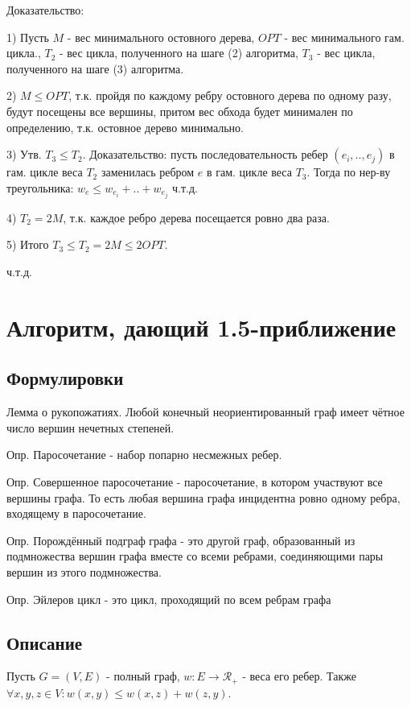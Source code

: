 \documentclass[a4paper,12pt]{article}
\begin{document}
Доказательство:

1) Пусть $M$ - вес минимального остовного дерева, $OPT$ - вес минимального гам. цикла., $T_2$ - вес цикла, полученного на шаге (2) алгоритма, $T_3$ - вес цикла, полученного на шаге (3) алгоритма.

2) $ M \leq OPT$, т.к. пройдя по каждому ребру остовного дерева по одному разу, будут посещены все вершины, притом вес обхода будет минимален по определению, т.к. остовное дерево минимально.

3) Утв. $T_3 \leq T_2$. Доказательство: пусть последовательность ребер $(e_i, .., e_j)$ в гам. цикле веса $T_2$ заменилась ребром $e$ в гам. цикле веса $T_3$. Тогда по нер-ву треугольника: $w_e \leq w_{e_i} + .. + w_{e_j}$ ч.т.д.

4) $T_2 = 2M$, т.к. каждое ребро дерева посещается ровно два раза.

5) Итого $T_3 \leq T_2 = 2M \leq 2OPT$.

ч.т.д.

\section{Алгоритм, дающий 1.5-приближение}

\subsection{Формулировки}

Лемма о рукопожатиях. Любой конечный неориентированный граф имеет чётное число вершин нечетных степеней.

Опр. Паросочетание - набор попарно несмежных ребер.

Опр. Совершенное паросочетание - паросочетание, в котором участвуют все вершины графа. То есть любая вершина графа инцидентна ровно одному ребра, входящему в паросочетание.

Опр. Порождённый подграф графа - это другой граф, образованный из подмножества вершин графа вместе со всеми ребрами, соединяющими пары вершин из этого подмножества.

Опр. Эйлеров цикл - это цикл, проходящий по всем ребрам графа 

\subsection{Описание}
Пусть $G = (V, E)$ - полный граф, $w: E \rightarrow \mathscr{R}_{+}$ - веса его ребер. Также $\forall x, y, z \in V: w(x, y) \leq w(x, z) + w(z, y)$. 
\end{document}
